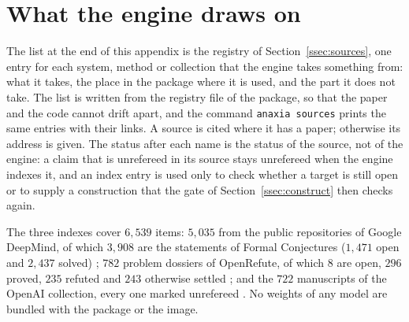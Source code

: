 \section{What the engine draws on}\label{app:sources}

The list at the end of this appendix is the registry of Section~\ref{ssec:sources}, one entry for each system, method or collection that the engine takes something from: what it takes, the place in the package where it is used, and the part it does not take. The list is written from the registry file of the package, so that the paper and the code cannot drift apart, and the command \texttt{anaxia sources} prints the same entries with their links. A source is cited where it has a paper; otherwise its address is given. The status after each name is the status of the source, not of the engine: a claim that is unrefereed in its source stays unrefereed when the engine indexes it, and an index entry is used only to check whether a target is still open or to supply a construction that the gate of Section~\ref{ssec:construct} then checks again.

The three indexes cover $6{,}539$ items: $5{,}035$ from the public repositories of Google DeepMind, of which $3{,}908$ are the statements of Formal Conjectures ($1{,}471$ open and $2{,}437$ solved) \cite{FCA25}; $782$ problem dossiers of OpenRefute, of which $8$ are open, $296$ proved, $235$ refuted and $243$ otherwise settled \cite{OIT26}; and the $722$ manuscripts of the OpenAI collection, every one marked unrefereed \cite{OAI26b}. No weights of any model are bundled with the package or the image.


